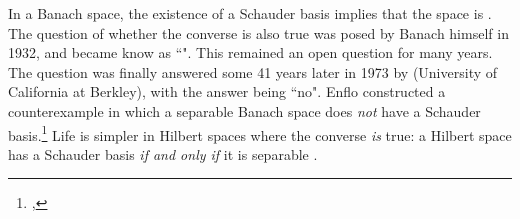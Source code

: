 In a Banach space, the existence of a Schauder basis implies that the space is  %
. %
The \label{BasisProblem} question of whether the converse is also true was posed by Banach himself in 1932,
and became know as ``".
This remained an open question for many years.
The question was finally answered some 41 years later in 1973 by  (University of California at Berkley),
with the answer being ``no".
Enflo constructed a counterexample in which a separable Banach space does \emph{not} have a Schauder
basis.\footnote{
  ,
  }
Life is simpler in Hilbert spaces where the converse \emph{is} true:
a Hilbert space has a Schauder basis \emph{if and only if} it is separable .

